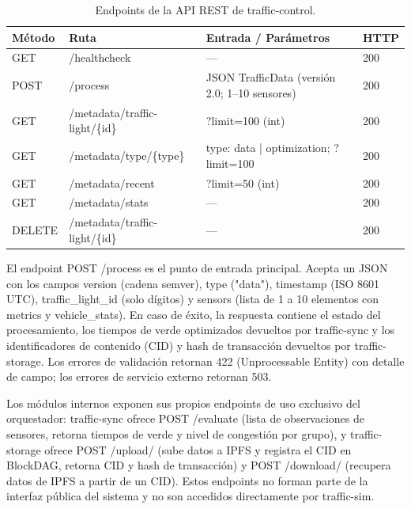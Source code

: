\begin{table}[htbp]
\centering
\caption{Endpoints de la API REST de traffic-control.}
\label{tab:api_traffic_control}
\renewcommand{\arraystretch}{1.3}
\footnotesize
\begin{tabular}{p{1.5cm}p{5.2cm}p{4.5cm}p{1.3cm}}
\toprule
\textbf{Método} & \textbf{Ruta} & \textbf{Entrada / Parámetros} & \textbf{HTTP} \\
\midrule
GET & /healthcheck & — & 200 \\
POST & /process & JSON TrafficData (versión 2.0; 1–10 sensores) & 200 \\
GET & /metadata/traffic-light/\{id\} & ?limit=100 (int) & 200 \\
GET & /metadata/type/\{type\} & type: data | optimization; ?limit=100 & 200 \\
GET & /metadata/recent & ?limit=50 (int) & 200 \\
GET & /metadata/stats & — & 200 \\
DELETE & /metadata/traffic-light/\{id\} & — & 200 \\
\bottomrule
\end{tabular}
\end{table}

El endpoint POST /process es el punto de entrada principal. Acepta un JSON con los campos version (cadena semver), type ("data"), timestamp (ISO 8601 UTC), traffic\_light\_id (solo dígitos) y sensors (lista de 1 a 10 elementos con metrics y vehicle\_stats). En caso de éxito, la respuesta contiene el estado del procesamiento, los tiempos de verde optimizados devueltos por traffic-sync y los identificadores de contenido (CID) y hash de transacción devueltos por traffic-storage. Los errores de validación retornan 422 (Unprocessable Entity) con detalle de campo; los errores de servicio externo retornan 503.

Los módulos internos exponen sus propios endpoints de uso exclusivo del orquestador: traffic-sync ofrece POST /evaluate (lista de observaciones de sensores, retorna tiempos de verde y nivel de congestión por grupo), y traffic-storage ofrece POST /upload/ (sube datos a IPFS y registra el CID en BlockDAG, retorna CID y hash de transacción) y POST /download/ (recupera datos de IPFS a partir de un CID). Estos endpoints no forman parte de la interfaz pública del sistema y no son accedidos directamente por traffic-sim.

